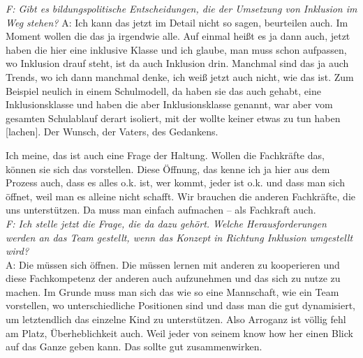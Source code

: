 \begin{linenumbers*}
\emph{F: Gibt es bildungspolitische Entscheidungen, die der Umsetzung von Inklusion im Weg stehen?} 
A: Ich kann das jetzt im Detail nicht so sagen, beurteilen auch. Im Moment wollen die das ja irgendwie alle. Auf einmal heißt es ja dann auch, jetzt haben die hier eine inklusive Klasse und ich glaube, man muss schon aufpassen, wo Inklusion drauf steht, ist da auch Inklusion drin. Manchmal sind das ja auch Trends, wo ich dann manchmal denke, ich weiß jetzt auch nicht, wie das ist. Zum Beispiel neulich in einem Schulmodell, da haben sie das auch gehabt, eine Inklusionsklasse und haben die aber Inklusionsklasse genannt, war aber vom gesamten Schulablauf derart isoliert, mit der wollte keiner etwas zu tun haben [lachen]. Der Wunsch, der Vaters, des Gedankens. 

Ich meine, das ist auch eine Frage der Haltung. Wollen die Fachkräfte das, können sie sich das vorstellen. Diese Öffnung, das kenne ich ja hier aus dem Prozess auch, dass es alles o.k. ist, wer kommt, jeder ist o.k. und dass man sich öffnet, weil man es alleine nicht schafft. Wir brauchen die anderen Fachkräfte, die uns unterstützen. Da muss man einfach aufmachen -- als Fachkraft auch.\\
\emph{F: Ich stelle jetzt die Frage, die da dazu gehört. Welche Herausforderungen werden an das Team gestellt, wenn das Konzept in Richtung Inklusion umgestellt wird?}\\
A: Die müssen sich öffnen. Die müssen lernen mit anderen zu kooperieren und diese Fachkompetenz der anderen auch aufzunehmen und das sich zu nutze zu machen. Im Grunde muss man sich das wie so eine Mannschaft, wie ein Team vorstellen, wo unterschiedliche Positionen sind und dass man die gut dynamisiert, um letztendlich das einzelne Kind zu unterstützen. Also Arroganz ist völlig fehl am Platz, Überheblichkeit auch. Weil jeder von seinem know how her einen Blick auf das Ganze geben kann. Das sollte gut zusammenwirken.


\end{linenumbers*}
